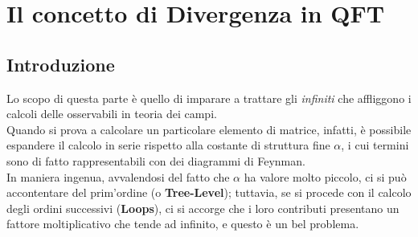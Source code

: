 \documentclass[../main.tex]{subfiles}
\begin{document}
\setchapterpreamble[u]{\margintoc}
\chapter[Il concetto di Divergenza in QFT]{Il concetto di Divergenza in QFT}
\label{ch:divergence}

\fboxsep =1pt %

\section{Introduzione}
Lo scopo di questa parte è quello di imparare a trattare gli \textit{infiniti} che affliggono i calcoli delle osservabili in teoria dei campi.\\
Quando si prova a calcolare un particolare elemento di matrice, infatti, è possibile espandere il calcolo in serie rispetto alla costante di struttura fine $\alpha$, i cui termini sono di fatto rappresentabili con dei diagrammi di Feynman.\\
In maniera ingenua, avvalendosi del fatto che $\alpha$ ha valore molto piccolo, ci si può accontentare del prim'ordine (o \textbf{Tree-Level}); tuttavia, se si procede con il calcolo degli ordini successivi (\textbf{Loops}), ci si accorge che i loro contributi presentano un fattore moltiplicativo che tende ad infinito, e questo è un bel problema.\\
\end{document}
